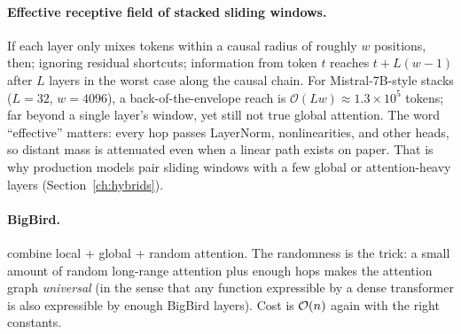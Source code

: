 \paragraph{Effective receptive field of stacked sliding windows.}
If each layer only mixes tokens within a causal radius of roughly \(w\)
positions, then; ignoring residual shortcuts; information from token
\(t\) reaches \(t + L(w-1)\) after \(L\) layers in the worst case along
the causal chain. For Mistral-7B-style stacks (\(L = 32\), \(w = 4096\)), a
back-of-the-envelope reach is \(\mathcal{O}(L w) \approx 1.3\times 10^{5}\)
tokens; far beyond a single layer's window, yet still not true global
attention. The word ``effective'' matters: every hop passes LayerNorm,
nonlinearities, and other heads, so distant mass is attenuated even when
a linear path exists on paper. That is why production models pair sliding
windows with a few global or attention-heavy layers
(Section~\ref{ch:hybrids}).

\paragraph{BigBird.} \citet{zaheer2020bigbird} combine local + global +
random attention. The randomness is the trick: a small amount of random
long-range attention plus enough hops makes the attention graph
\emph{universal} (in the sense that any function expressible by a dense
transformer is also expressible by enough BigBird layers). Cost is
\(\mathcal{O}(n)\) again with the right constants.

